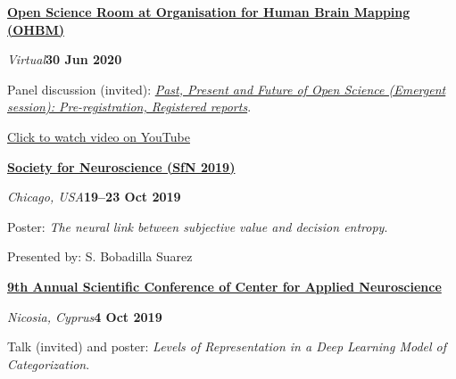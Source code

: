 \documentclass[10pt]{article}
\newenvironment{outerlist}[1][\enskip\textbullet]%
        {\begin{itemize}[#1]}{\end{itemize}%
         \vspace{-.6\baselineskip}}
\newenvironment{innerlist}[1][\enskip\textbullet]%
        {\begin{compactitem}[#1]}{\end{compactitem}}
\begin{document}
\textbf{\href{https://ohbm.github.io/osr2020/}{Open Science Room at Organisation for Human Brain Mapping (OHBM)}}
\begin{outerlist}
  \item[] \textit{Virtual}\hfill\textbf{30 Jun 2020}
  \begin{innerlist}
    \item Panel discussion (invited):  \href{https://github.com/ohbm/osr2020/issues/88}{\textit{Past, Present and Future of Open Science (Emergent session): Pre-registration, Registered reports}}.
    \item  \href{https://youtu.be/VIbD6QXM8Zc}{Click to watch video on YouTube}
  \end{innerlist}
\end{outerlist}
\vspace{8pt}

\begin{samepage}

\textbf{\href{https://www.sfn.org/meetings/neuroscience-2019}{Society for Neuroscience (SfN 2019)}}
\begin{outerlist}
  \item[] \textit{Chicago, USA}\hfill\textbf{19--23 Oct 2019}
  \begin{innerlist}
    \item Poster: \textit{The neural link between subjective value and decision entropy}.
    \item{Presented by: S. Bobadilla Suarez}
  \end{innerlist}
\end{outerlist}
\vspace{8pt}\end{samepage}



\begin{samepage}

\textbf{\href{https://www.cancyprus.org/wp-content/uploads/2019/10/Conference-Booklet-2019-print.pdf}{9th Annual Scientific Conference of Center for Applied Neuroscience}}
\begin{outerlist}
  \item[] \textit{Nicosia, Cyprus}\hfill\textbf{4 Oct 2019}
  \begin{innerlist}
    \item Talk (invited) and poster:  \textit{Levels of Representation in a Deep Learning Model of Categorization}.
  \end{innerlist}
\end{outerlist}
\vspace{8pt}\end{samepage}
\end{document}
